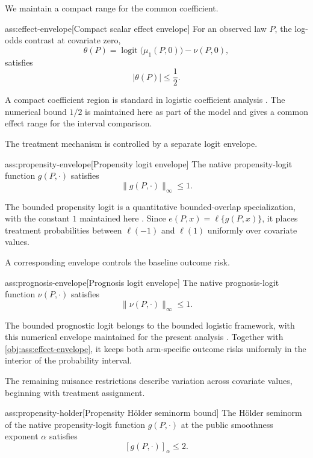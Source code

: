 \documentclass[11pt]{article}
\begin{document}
We maintain a compact range for the common coefficient.

\begin{assumptionv}{ass:effect-envelope}[Compact scalar effect envelope]
For an observed law \(P\), the log-odds contrast at covariate zero,
\[
\theta(P)=\operatorname{logit}\bigl(\mu_1(P,0)\bigr)-\nu(P,0),
\]
satisfies
\[
|\theta(P)|\le \frac12.
\]
\end{assumptionv}

A compact coefficient region is standard in logistic coefficient analysis \citep{LiuZhangZhou2020LogisticDML}. The numerical bound \(1/2\) is maintained here as part of the model and gives a common effect range for the interval comparison.

The treatment mechanism is controlled by a separate logit envelope.

\begin{assumptionv}{ass:propensity-envelope}[Propensity logit envelope]
The native propensity-logit function \(g(P,\cdot)\) satisfies
\[
\|g(P,\cdot)\|_\infty\le 1.
\]
\end{assumptionv}

The bounded propensity logit is a quantitative bounded-overlap specialization, with the constant \(1\) maintained here \citep{RobinsTchetgenLiVanderVaart2009Minimax}. Since \(e(P,x)=\ell\{g(P,x)\}\), it places treatment probabilities between \(\ell(-1)\) and \(\ell(1)\) uniformly over covariate values.

A corresponding envelope controls the baseline outcome risk.

\begin{assumptionv}{ass:prognosis-envelope}[Prognosis logit envelope]
The native prognosis-logit function \(\nu(P,\cdot)\) satisfies
\[
\|\nu(P,\cdot)\|_\infty\le 1.
\]
\end{assumptionv}

The bounded prognostic logit belongs to the bounded logistic framework, with this numerical envelope maintained for the present analysis \citep{LiuZhangZhou2020LogisticDML}. Together with \cref{obj:ass:effect-envelope}, it keeps both arm-specific outcome risks uniformly in the interior of the probability interval.

The remaining nuisance restrictions describe variation across covariate values, beginning with treatment assignment.

\begin{assumptionv}{ass:propensity-holder}[Propensity Hölder seminorm bound]
The Hölder seminorm of the native propensity-logit function \(g(P,\cdot)\) at the public smoothness exponent \(\alpha\) satisfies
\[
[g(P,\cdot)]_\alpha\le 2.
\]
\end{assumptionv}
\end{document}
